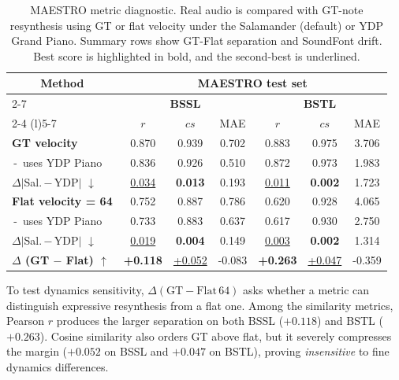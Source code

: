 \begin{table}[!ht]
\caption{MAESTRO metric diagnostic. Real audio is compared with GT-note resynthesis using GT or flat velocity under the Salamander (default) or YDP Grand Piano. Summary rows show GT-Flat separation and SoundFont drift. Best score is highlighted in bold, and the second-best is underlined.}
\label{tab:bp_metric_diagnostic}
\centering
\fontsize{11pt}{13pt}\selectfont
\setlength{\tabcolsep}{11pt}
\renewcommand{\arraystretch}{1.2}
\begin{tabular}{l||ccc|ccc}
\toprule
\multicolumn{1}{c||}{\multirow{3}{*}{\textbf{Method}}}
& \multicolumn{6}{c}{\textbf{MAESTRO test set}} \\
\cmidrule(l){2-7}
& \multicolumn{3}{c|}{\textbf{BSSL}} & \multicolumn{3}{c}{\textbf{BSTL}} \\
\cmidrule(lr){2-4} \cmidrule(l){5-7}
& $r$ & $cs$ & MAE & $r$ & $cs$ & MAE \\
\midrule
\textbf{GT velocity}            & 0.870 & 0.939 & 0.702 & 0.883 & 0.975 & 3.706 \\
\,-\, uses YDP Piano            & 0.836 & 0.926 & 0.510 & 0.872 & 0.973 & 1.983 \\
$\Delta\lvert$Sal.\,$-$\,YDP$\rvert$ $\downarrow$
                                & \underline{0.034} & \textbf{0.013} & 0.193
                                & \underline{0.011} & \textbf{0.002} & 1.723 \\
\midrule
\textbf{Flat velocity = 64}     & 0.752 & 0.887 & 0.786 & 0.620 & 0.928 & 4.065 \\
\,-\, uses YDP Piano            & 0.733 & 0.883 & 0.637 & 0.617 & 0.930 & 2.750 \\
$\Delta\lvert$Sal.\,$-$\,YDP$\rvert$ $\downarrow$
                                & \underline{0.019} & \textbf{0.004} & 0.149
                                & \underline{0.003} & \textbf{0.002} & 1.314 \\
\midrule
\textbf{$\Delta$ (GT $-$ Flat) $\uparrow$}
                                & \textbf{+0.118} & \underline{+0.052} & -0.083
                                & \textbf{+0.263} & \underline{+0.047} & -0.359 \\
\bottomrule
\end{tabular}
\end{table}

To test dynamics sensitivity, $\Delta(\mathrm{GT} - \mathrm{Flat\,64})$ asks whether a metric can distinguish expressive resynthesis from a flat one. Among the similarity metrics, Pearson $r$ produces the larger separation on both BSSL ($+0.118$) and BSTL ($+0.263$). Cosine similarity also orders GT above flat, but it severely compresses the margin ($+0.052$ on BSSL and $+0.047$ on BSTL), proving \emph{insensitive} to fine dynamics differences.

